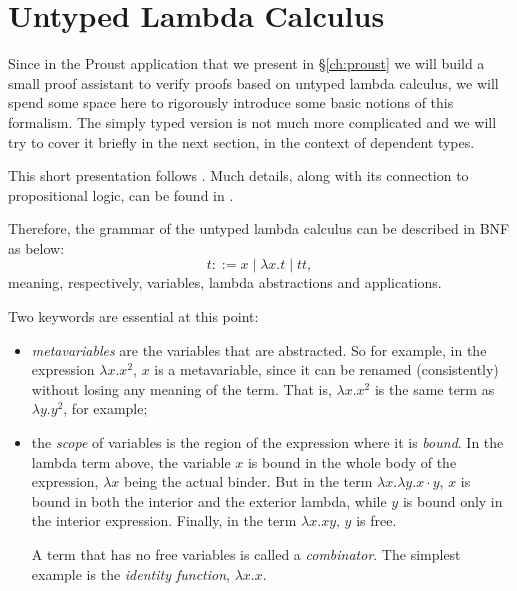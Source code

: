 \section{Untyped Lambda Calculus}
\label{sec:unty-lambda}

\indent\indent Since in the Proust application that we present in \S\ref{ch:proust}
we will build a small proof assistant to verify proofs based on
untyped lambda calculus, we will spend some space here to rigorously
introduce some basic notions of this formalism. The simply typed version
is not much more complicated and we will try to cover it briefly in
the next section, in the context of dependent types.

This short presentation follows \cite[\S5]{tapl}. Much details, along
with its connection to propositional logic, can be found in
\cite{ch}.

Therefore, the grammar of the untyped lambda calculus can be described
in BNF as below:
\[
  t ::= x \mid \lambda x . t \mid t t,
\]
meaning, respectively, variables, lambda abstractions and applications.

Two keywords are essential at this point:
\begin{itemize}
\item \emph{metavariables} are the variables that are abstracted.
  So for example, in the expression $ \lambda x . x^2 $, $ x $ is
  a metavariable, since it can be renamed (consistently) without
  losing any meaning of the term. That is, $ \lambda x . x^2 $ is
  the same term as $ \lambda y . y^2 $, for example;
\item the \emph{scope} of variables is the region of the expression
  where it is \emph{bound}. In the lambda term above, the variable
  $ x $ is bound in the whole body of the expression, $ \lambda x $
  being the actual binder. But in the term
  $ \lambda x . \lambda y . x \cdot y $, $ x $ is bound
  in both the interior and the exterior lambda, while $ y $ is bound
  only in the interior expression. Finally, in the term
  $ \lambda x . xy $, $ y $ is free.

  A term that has no free variables is called a \emph{combinator}.
  The simplest example is the \emph{identity function},
  $ \lambda x . x $.
\end{itemize}

